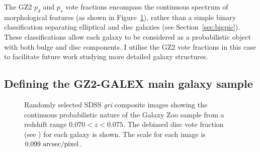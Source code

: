 The GZ2 $p_d$ and $p_s$ vote fractions encompass the continuous spectrum of morphological features (as shown in Figure~\ref{fig:mosaic}), rather than a simple binary classification separating elliptical and disc galaxies (see Section~\ref{sec:bigpic}). These classifications allow each galaxy to be considered as a probabilistic object with both bulge and disc components. I utilise the GZ2 vote fractions in this case to facilitate future work studying more detailed galaxy structures. 

\subsection{Defining the GZ2-GALEX main galaxy sample}\label{sec:defsample}

\begin{figure}
\caption[Example SDSS images with GZ2 vote fractions]{Randomly selected SDSS \emph{gri} composite images showing the continuous probabilistic nature of the Galaxy Zoo sample from a redshift range $0.070 < z < 0.075$. The debiased disc vote fraction (see \citealt{GZ2}) for each galaxy is shown. The scale for each image is $0.099~\rm{arcsec/pixel}$.}
\label{fig:mosaic}
\end{figure}

